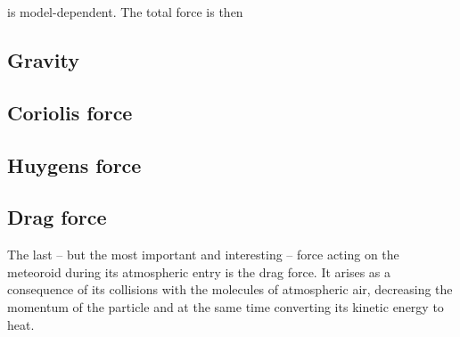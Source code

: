 %



    is model-dependent. The total force is then

    \subsection{Gravity} \label{dfg}
        

    \subsection{Coriolis force} \label{dfC}


    \subsection{Huygens force} \label{dfH}


    \subsection{Drag force} \label{dfd}
        The last -- but the most important and interesting -- force acting on the meteoroid during
        its atmospheric entry is the drag force. It arises as a consequence of its collisions with
        the molecules of atmospheric air, decreasing the momentum of the particle and at the
        same time converting its kinetic energy to heat.

